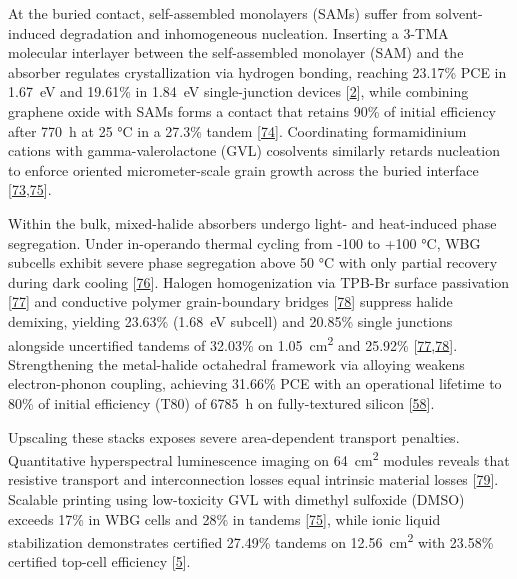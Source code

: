 \documentclass[
  11pt,
]{article}
\begin{document}
At the buried contact, self-assembled monolayers (SAMs) suffer from
solvent-induced degradation and inhomogeneous nucleation. Inserting a
3-TMA molecular interlayer between the self-assembled monolayer (SAM)
and the absorber regulates crystallization via hydrogen bonding,
reaching 23.17\% PCE in \qty{1.67}{\electronvolt} and 19.61\% in
\qty{1.84}{\electronvolt} single-junction devices
{[}\href{https://doi.org/10.1002/anie.1676645}{2}{]}, while combining
graphene oxide with SAMs forms a contact that retains 90\% of initial
efficiency after \qty{770}{\hour} at 25 °C in a 27.3\% tandem
{[}\href{https://doi.org/10.1016/j.joule.2026.102575}{74}{]}.
Coordinating formamidinium cations with gamma-valerolactone (GVL)
cosolvents similarly retards nucleation to enforce oriented
micrometer-scale grain growth across the buried interface
{[}\href{https://doi.org/10.1007/s40820-026-02291-9}{73},\href{https://doi.org/10.1002/advs.76463}{75}{]}.

Within the bulk, mixed-halide absorbers undergo light- and heat-induced
phase segregation. Under in-operando thermal cycling from -100 to +100
°C, WBG subcells exhibit severe phase segregation above 50 °C with only
partial recovery during dark cooling
{[}\href{https://doi.org/10.1021/acsenergylett.6c00992}{76}{]}. Halogen
homogenization via TPB-Br surface passivation
{[}\href{https://doi.org/10.1002/anie.5530609}{77}{]} and conductive
polymer grain-boundary bridges
{[}\href{https://doi.org/10.1002/adma.74183}{78}{]} suppress halide
demixing, yielding 23.63\% (\qty{1.68}{\electronvolt} subcell) and
20.85\% single junctions alongside uncertified tandems of 32.03\% on
\qty{1.05}{\centi\meter\squared} and 25.92\%
{[}\href{https://doi.org/10.1002/anie.5530609}{77},\href{https://doi.org/10.1002/adma.74183}{78}{]}.
Strengthening the metal-halide octahedral framework via 
alloying weakens electron-phonon coupling, achieving 31.66\% PCE with an
operational lifetime to 80\% of initial efficiency (T80) of
\qty{6785}{\hour} on fully-textured silicon
{[}\href{https://doi.org/10.1002/aenm.71317}{58}{]}.

Upscaling these stacks exposes severe area-dependent transport
penalties. Quantitative hyperspectral luminescence imaging on
\qty{64}{\centi\meter\squared} modules reveals that resistive transport
and interconnection losses equal intrinsic material losses
{[}\href{https://doi.org/10.1002/solr.70375}{79}{]}. Scalable printing
using low-toxicity GVL with dimethyl sulfoxide (DMSO) exceeds 17\% in
WBG cells and 28\% in tandems
{[}\href{https://doi.org/10.1002/advs.76463}{75}{]}, while ionic liquid
stabilization demonstrates certified 27.49\% tandems on
\qty{12.56}{\centi\meter\squared} with 23.58\% certified top-cell
efficiency {[}\href{https://doi.org/10.1126/sciadv.aef6600}{5}{]}.
\end{document}
